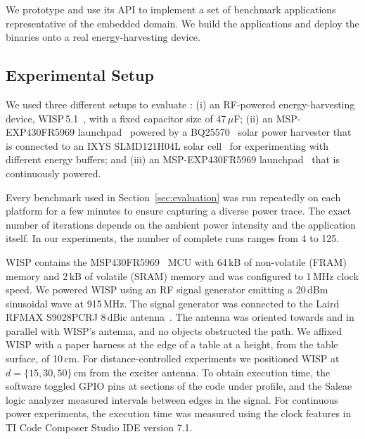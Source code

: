 We prototype \sys and use its API to implement a set of benchmark applications representative of the embedded domain. We build the applications and deploy the binaries onto a real energy-harvesting device. 


\subsection{Experimental Setup}
\label{sec:results_hardware_software}
%
We used three different setups to evaluate \sys: 
(i) an RF-powered energy-harvesting device, WISP\,5.1~\cite{wisp5,wisp}, with a fixed capacitor size of 47\,$\mu$F; 
(ii) an MSP-EXP430FR5969 launchpad~\cite{MSP-EXP430FR5969_launchpad} powered by a BQ25570~\cite{BQ25570EVM-206_website} solar power harvester that is connected to an IXYS SLMD121H04L solar cell~\cite{SLMD121H04L_website} for experimenting with different energy buffers; and
(iii) an MSP-EXP430FR5969 launchpad~\cite{MSP-EXP430FR5969_launchpad} that is continuously powered.

Every benchmark used in Section~\ref{sec:evaluation} was run repeatedly on
each platform for a few minutes to ensure capturing a diverse power 
trace. The exact number of iterations depends on the ambient power intensity and the application itself.
In our experiments, the number of complete runs ranges from 4 to 125.


WISP contains the MSP430FR5969~\cite{wolverine} MCU with 64\,kB of
non-volatile (FRAM) memory and 2\,kB of volatile (SRAM) memory and was
configured to 1\,MHz clock speed.
We powered WISP using an RF signal generator emitting a 20\,dBm sinusoidal wave at 915\,MHz.
The signal generator was connected to the Laird RFMAX S9028PCRJ 8\,dBic
antenna~\cite{atlas2015}.
The antenna was oriented towards and in parallel with WISP's antenna, and
no objects obstructed the path.
We affixed WISP with a paper harness at the edge of a table at a height, from the table surface, of 10\,cm.
For distance-controlled experiments we positioned WISP at $d=\{15, 30,
50\}$\,cm from the exciter antenna.
To obtain execution time, the software toggled GPIO pins at sections of the code
under profile, and the Saleae~\cite{saleae} logic analyzer measured
intervals between edges in the signal. For continuous power experiments, the 
execution time was measured using the clock features in TI Code Composer Studio IDE version 7.1.
%
